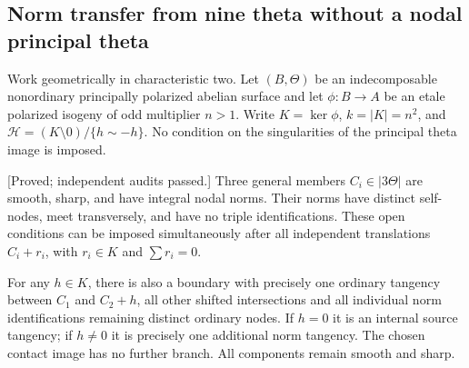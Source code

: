 \subsection{Norm transfer from nine theta without a nodal principal theta}
\label{subsec:nine-theta-norm-transfer-candidate}

Work geometrically in characteristic two. Let $(B,\Theta)$ be an
indecomposable nonordinary principally polarized abelian surface and
let $\phi:B\to A$ be an etale polarized isogeny of odd multiplier
$n>1$. Write $K=\ker\phi$, $k=|K|=n^2$, and
$\mathcal H=(K\setminus0)/\{h\sim-h\}$. No condition on the
singularities of the principal theta image is imposed.

\begin{lemma}
\label{lem:nine-theta-clean-cubic-contacts-candidate}
\textup{[Proved; independent audits passed.]}
Three general members $C_i\in|3\Theta|$ are smooth, sharp, and
have integral nodal norms. Their norms have distinct self-nodes,
meet transversely, and have no triple identifications. These open
conditions can be imposed simultaneously after all independent
translations $C_i+r_i$, with $r_i\in K$ and $\sum r_i=0$.

For any $h\in K$, there is also a boundary with precisely one
ordinary tangency between $C_1$ and $C_2+h$, all other shifted
intersections and all individual norm identifications remaining
distinct ordinary nodes. If $h=0$ it is an internal source
tangency; if $h\ne0$ it is precisely one additional norm tangency.
The chosen contact image has no further branch. All components
remain smooth and sharp.
\end{lemma}

